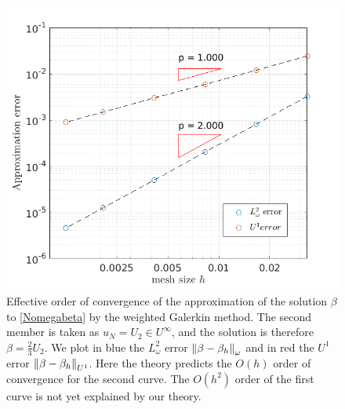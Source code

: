 \documentclass[a4paper]{subfiles}
\begin{document}
\begin{figure}
	\centering
	\hspace{-1cm}\includegraphics[scale = 0.4]{OpenArc/figs/ordreCVNeu}
	\caption{Effective order of convergence of the approximation of the solution $\beta$ to \eqref{Nomegabeta} by the weighted Galerkin method. The second member is taken as $u_N = U_2 \in U^{\infty}$, and the solution is therefore $\beta = \frac{2}{3}U_2$. We plot in blue the $L^2_\omega$ error $\left\|\beta - \beta_h\right\|_{\omega}$ and in red the $U^1$ error $\left\|\beta - \beta_h\right\|_{U^1}$. Here the theory predicts the $O(h)$ order of convergence for the second curve. The $O(h^2)$ order of the first curve is not yet explained by our theory.} 
	\label{fig:errL2Neu}
\end{figure}
\end{document}
